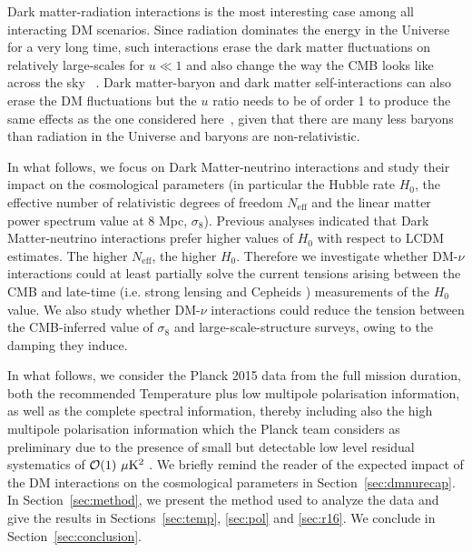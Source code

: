 \documentclass[aps,prd,a4paper,twocolumn,amsmath,showpacs,superscriptaddress,nofootinbib,preprintnumbers]{revtex4-1}
\newcommand{\neff}{N_{\mathrm{eff}}}
\begin{document}
Dark matter-radiation interactions is the most interesting case among all interacting DM scenarios. Since radiation dominates the energy in the Universe for a very long time, such interactions erase the dark matter fluctuations on relatively large-scales for $u \ll 1 $ and also change the way the CMB looks like across the sky ~\cite{Boehm:2000gq,Boehm:2001hm,Chen:2002yh,Boehm:2004th,Sigurdson:2004zp,Mangano:2006mp,Serra:2009uu,CyrRacine:2012fz, Diamanti:2012tg, Diamanti:2012tg,Blennow:2012de,Dolgov:2013una,Wilkinson:2013kia,Dvorkin:2013cea}. 
Dark matter-baryon and dark matter self-interactions can also erase the DM fluctuations but the $u$ ratio needs to be of order 1 to produce the same effects as the one considered here~\cite{Boehm:2000gq,Boehm:2004th}, given that there  are many less baryons than radiation in the Universe and baryons are non-relativistic.

In what follows, we focus on Dark Matter-neutrino interactions and study their impact on the cosmological parameters (in particular the Hubble rate $H_0$, the effective number of relativistic degrees of freedom $\neff$ and the linear matter power spectrum value at 8 Mpc, $\sigma_8$). Previous analyses \cite{Wilkinson:2014ksa} indicated that Dark Matter-neutrino interactions prefer higher values of $H_0$ with respect to LCDM estimates. The higher $\neff$, the higher $H_0$. Therefore we investigate  whether DM-$\nu$ interactions could at least partially solve the current tensions arising between the CMB and late-time (i.e. strong lensing \cite{Bonvin:2016crt} and Cepheids \cite{R16}) measurements of the $H_0$ value. We also study whether DM-$\nu$ interactions could reduce the tension between the CMB-inferred value of $\sigma_8$ and large-scale-structure surveys,  owing to the damping they induce.   

In what follows, we consider the Planck 2015 data from the full mission duration, both the recommended Temperature plus low multipole polarisation information, as well as the complete spectral information, thereby including also the high multipole polarisation information which the Planck team considers as preliminary due to the presence of small but detectable low level residual systematics of ${\cal{O}}(1) \ \mu\rm{K}^2$  \cite{Aghanim:2015xee}. We briefly remind the reader of the expected impact of the DM interactions on the cosmological parameters in Section~\ref{sec:dmnurecap}. In Section~\ref{sec:method}, we present the method used to analyze the data and give the results in Sections~\ref{sec:temp}, \ref{sec:pol} and \ref{sec:r16}. We conclude in Section~\ref{sec:conclusion}.
\end{document}
